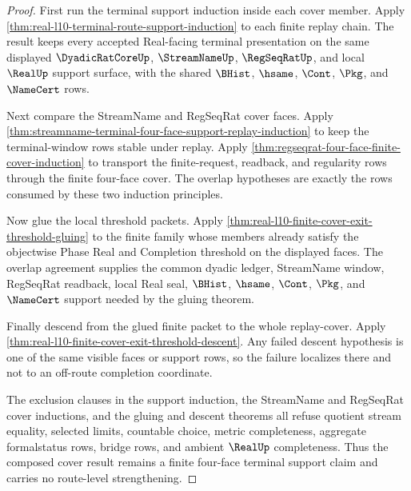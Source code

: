 \begin{proof}
First run the terminal support induction inside each cover member. Apply
\autoref{thm:real-l10-terminal-route-support-induction} to each finite replay
chain. The result keeps every accepted Real-facing terminal presentation on
the same displayed $\DyadicRatCoreUp$, $\StreamNameUp$, $\RegSeqRatUp$, and
local $\RealUp$ support surface, with the shared $\BHist$, $\hsame$, $\Cont$,
$\Pkg$, and $\NameCert$ rows.

Next compare the StreamName and RegSeqRat cover faces. Apply
\autoref{thm:streamname-terminal-four-face-support-replay-induction} to keep
the terminal-window rows stable under replay. Apply
\autoref{thm:regseqrat-four-face-finite-cover-induction} to transport the
finite-request, readback, and regularity rows through the finite four-face
cover. The overlap hypotheses are exactly the rows consumed by these two
induction principles.

Now glue the local threshold packets. Apply
\autoref{thm:real-l10-finite-cover-exit-threshold-gluing} to the finite
family whose members already satisfy the objectwise Phase Real and Completion
threshold on the displayed faces. The overlap agreement supplies the common
dyadic ledger, StreamName window, RegSeqRat readback, local Real seal,
$\BHist$, $\hsame$, $\Cont$, $\Pkg$, and $\NameCert$ support needed by the
gluing theorem.

Finally descend from the glued finite packet to the whole replay-cover. Apply
\autoref{thm:real-l10-finite-cover-exit-threshold-descent}. Any failed
descent hypothesis is one of the same visible faces or support rows, so the
failure localizes there and not to an off-route completion coordinate.

The exclusion clauses in the support induction, the StreamName and RegSeqRat
cover inductions, and the gluing and descent theorems all refuse quotient
stream equality, selected limits, countable choice, metric completeness,
aggregate formalstatus rows, bridge rows, and ambient $\RealUp$ completeness.
Thus the composed cover result remains a finite four-face terminal support
claim and carries no route-level strengthening.
\end{proof}

